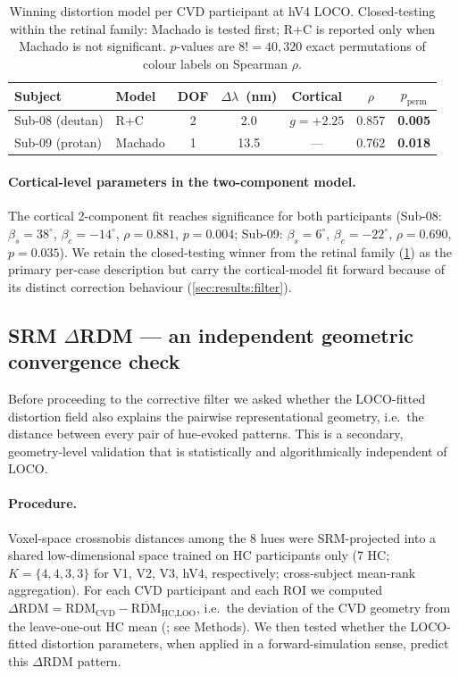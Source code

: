\begin{table}[tb]
  \caption{Winning distortion model per CVD participant at hV4 LOCO.
  Closed-testing within the retinal family: Machado is tested first;
  R+C is reported only when Machado is not significant. $p$-values are
  $8! = 40{,}320$ exact permutations of colour labels on Spearman
  $\rho$.}
  \label{tab:main}
  \centering
  \small
  \begin{tabular}{llccccc}
    \toprule
    Subject & Model & DOF &
    $\Delta\lambda$~(nm) & Cortical &
    $\rho$ & $p_{\text{perm}}$ \\
    \midrule
    Sub-08 (deutan)  & R+C     & 2 & 2.0  & $g = +2.25$ & 0.857 & \textbf{0.005} \\
    Sub-09 (protan)  & Machado & 1 & 13.5 & ---         & 0.762 & \textbf{0.018} \\
    \bottomrule
  \end{tabular}
\end{table}

\paragraph{Cortical-level parameters in the two-component model.}
The cortical 2-component fit reaches significance for both
participants (Sub-08: $\beta_s = 38^\circ$, $\beta_c = -14^\circ$,
$\rho = 0.881$, $p = 0.004$; Sub-09: $\beta_s = 6^\circ$,
$\beta_c = -22^\circ$, $\rho = 0.690$, $p = 0.035$). We retain the
closed-testing winner from the retinal family
(\cref{tab:main}) as the primary per-case description but carry the
cortical-model fit forward because of its distinct correction
behaviour (\cref{sec:results:filter}).

\subsection{SRM $\Delta$RDM --- an independent geometric convergence
check}
\label{sec:results:srm}

Before proceeding to the corrective filter we asked whether the
LOCO-fitted distortion field also explains the pairwise
representational geometry, i.e.\ the distance between every pair of
hue-evoked patterns. This is a secondary, geometry-level validation
that is statistically and algorithmically independent of LOCO.

\paragraph{Procedure.}
Voxel-space crossnobis distances among the 8 hues were SRM-projected
into a shared low-dimensional space trained on HC participants only
(7 HC; $K = \{4,4,3,3\}$ for V1, V2, V3, hV4, respectively;
cross-subject mean-rank aggregation). For each CVD participant and
each ROI we computed
$\Delta\text{RDM} = \text{RDM}_{\text{CVD}} - \overline{\text{RDM}}_{\text{HC,LOO}}$,
i.e.\ the deviation of the CVD geometry from the leave-one-out HC
mean (\citealp{schuett2023, chen2015, bannert2025}; see Methods). We
then tested whether the LOCO-fitted distortion parameters, when applied
in a forward-simulation sense, predict this $\Delta$RDM pattern.

